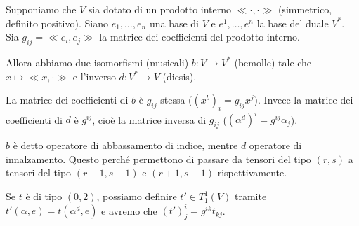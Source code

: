 Supponiamo che $V$ sia dotato di un prodotto interno $\ll \cdot, \cdot \gg$ (simmetrico, definito positivo). Siano $e_1,\dots,e_n$ una base di $V$ e $e^1,\dots,e^n$ la base del duale $V^*$.
Sia $g_{ij} = \ll e_i,e_j\gg$ la matrice dei coefficienti del prodotto interno.

Allora abbiamo due isomorfismi (musicali) $b:V\to V^*$ (bemolle) tale che $x\mapsto \ll x,\cdot \gg$ e l'inverso $d:V^*\to V$ (diesis).

La matrice dei coefficienti di $b$ è $g_{ij}$ stessa ($(x^b)_i = g_{ij}x^j$).
Invece la matrice dei coefficienti di $d$ è $g^{ij}$, cioè la matrice inversa di $g_{ij}$ ($(\alpha^d)^i = g^{ij}\alpha_j$).

$b$ è detto operatore di abbassamento di indice, mentre $d$ operatore di innalzamento. Questo perché permettono di passare da tensori del tipo $(r,s)$ a tensori del tipo $(r-1,s+1)$ e $(r+1,s-1)$ rispettivamente.

\begin{example}
	Se $t$ è di tipo $(0,2)$, possiamo definire $t'\in T_1^1(V)$ tramite $t'(\alpha, e) = t(\alpha^d, e)$ e avremo che $(t')_j^i = g^{ik}t_{kj}$.
\end{example}

